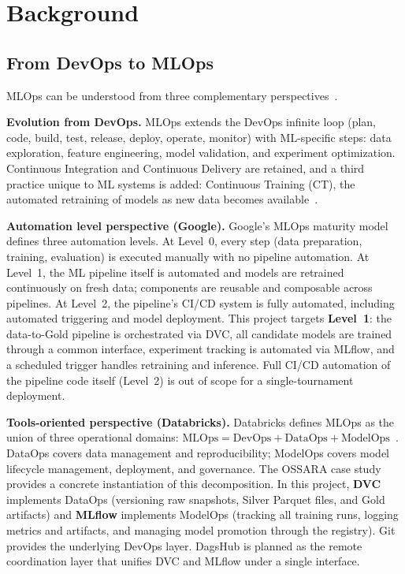 \documentclass[conference]{IEEEtran}
\begin{document}
\section{Background}
\label{sec:background}

\subsection{From DevOps to MLOps}

MLOps can be understood from three complementary perspectives~\cite{moreschini2022mlops}.

\textbf{Evolution from DevOps.}
MLOps extends the DevOps infinite loop (plan, code, build, test, release, deploy,
operate, monitor) with ML-specific steps: data exploration, feature engineering, model
validation, and experiment optimization. Continuous Integration and Continuous Delivery
are retained, and a third practice unique to ML systems is added: Continuous Training
(CT), the automated retraining of models as new data becomes available~\cite{ossara2023}.

\textbf{Automation level perspective (Google).}
Google's MLOps maturity model~\cite{google_mlops} defines three automation levels.
At Level~0, every step (data preparation, training, evaluation) is executed manually
with no pipeline automation. At Level~1, the ML pipeline itself is automated and models
are retrained continuously on fresh data; components are reusable and composable across
pipelines. At Level~2, the pipeline's CI/CD system is fully automated, including automated
triggering and model deployment. This project targets \textbf{Level~1}: the data-to-Gold
pipeline is orchestrated via DVC, all candidate models are trained through a common
interface, experiment tracking is automated via MLflow, and a scheduled trigger handles
retraining and inference. Full CI/CD automation of the pipeline code itself (Level~2) is
out of scope for a single-tournament deployment.

\textbf{Tools-oriented perspective (Databricks).}
Databricks defines MLOps as the union of three operational domains:
$\text{MLOps} = \text{DevOps} + \text{DataOps} + \text{ModelOps}$~\cite{databricks_bigbook}.
DataOps covers data management and reproducibility; ModelOps covers model lifecycle
management, deployment, and governance. The OSSARA case study~\cite{ossara2023} provides
a concrete instantiation of this decomposition. In this project, \textbf{DVC} implements
DataOps (versioning raw snapshots, Silver Parquet files, and Gold artifacts) and
\textbf{MLflow} implements ModelOps (tracking all training runs, logging metrics and
artifacts, and managing model promotion through the registry). Git provides the underlying
DevOps layer. DagsHub is planned as the remote coordination layer that unifies DVC and
MLflow under a single interface.
\end{document}
